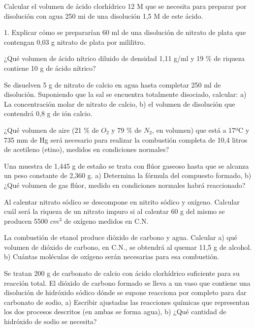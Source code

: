 \begin{multicols}{2}
\begin{problem}
Calcular el volumen de ácido clorhídrico 12 M que se necesita para preparar por disolución con agua 250 mi de una disolución 1,5 M de este ácido.
\end{problem}
\begin{problem}
1.	Explicar cómo se prepararían 60 ml de una disolución de nitrato de plata que contengan 0,03 g nitrato de plata por mililitro.
\end{problem}
\begin{problem}
¿Qué volumen de ácido nítrico diluido de densidad 1,11 g/ml y 19 \% de riqueza contiene 10 g de ácido nítrico?
\end{problem}
\begin{problem}
Se disuelven 5 g de nitrato de calcio en agua hasta completar 250 ml de disolución. Suponiendo que la sal se encuentra totalmente disociado, calcular: a) La concentración molar de nitrato de calcio, b) el volumen de disolución que contendrá 0,8 g de ión calcio.
\end{problem}
\begin{problem}
¿Qué volumen de aire (21 \% de $O_2$ y 79 \% de $N_2$, en volumen) que está a 17ºC y 735 mm de Hg será necesario para realizar la combustión completa de 10,4 litros de acetileno (etino), medidos en condiciones normales?	
\end{problem}
\begin{problem}
Una muestra de 1,445 g de estaño se trata con flúor gaseoso hasta que se alcanza un peso constante de 2,360 g. a) Determina la fórmula del compuesto formado, b) ¿Qué volumen de gas flúor, medido en condiciones normales habrá reaccionado?
\end{problem}
\begin{problem}
Al calentar nitrato sódico se descompone en nitrito sódico y oxígeno. Calcular cuál será la riqueza de un nitrato impuro si al calentar 60 g del mismo se producen 5500 $cm^3$ de oxígeno medidos en C.N.
\end{problem}
\begin{problem}
La combustión de etanol produce dióxido de carbono y agua. Calcular a) qué volumen de dióxido de carbono, en C.N., se obtendrá al quemar 11,5 g de alcohol. b) Cuántas moléculas de oxígeno serán necesarias para esa combustión.	
\end{problem}
\begin{problem}
Se tratan 200 g de carbonato de calcio con ácido clorhídrico suficiente para su reacción total. El dióxido de carbono formado se lleva a un vaso que contiene una disolución de hidróxido sódico dónde se supone reacciona por completo para dar carbonato de sodio, a) Escribir ajustadas las reacciones químicas que representan los dos procesos descritos (en ambas se forma agua), b) ¿Qué cantidad de hidróxido de sodio se necesita?	

\end{problem}
\end{multicols}
